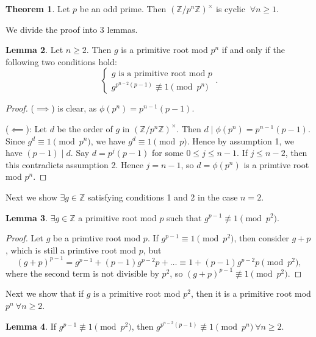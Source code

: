 \documentclass{article}
\theoremstyle{definition}
\newtheorem{theorem}{Theorem}[section]
\newtheorem{lemma}[theorem]{Lemma}
\begin{document}
\begin{theorem}%
    Let $p$ be an odd prime. Then $(\mathbb{Z}/p^n\mathbb{Z})^{\times}$ is cyclic $~\forall n\ge 1$.
\end{theorem}
We divide the proof into 3 lemmas.
\begin{lemma}%
    Let $n \ge 2$. Then $g$ is a primitive root mod $p^n$ if and only if the following two conditions hold: 
    \[
    \begin{cases}
        g \text{ is a primitive root mod }p \\
        g^{p^{n-2}(p-1)} \not\equiv 1 \pmod{p^n}
    \end{cases}.
    \]
\end{lemma}
\begin{proof}
    ($\implies $) is clear, as $\phi(p^n)=p^{n-1}(p-1)$.

    ($\impliedby$): Let $d$ be the order of $g$ in $(\mathbb{Z}/p^n\mathbb{Z})^{\times}$. Then $d \mid \phi(p^n) = p^{n-1}(p-1)$. Since $g^d \equiv 1 \pmod{p^n}$, we have $g^d \equiv 1 \pmod{p}$. Hence by assumption 1, we have $(p-1)\mid d$. Say $d = p^j (p-1)$ for some $0\le j \le n-1$. If $j\le n-2$, then this contradicts assumption 2. Hence $j=n-1$, so $d=\phi(p^n)$ is a primtive root mod $p^n$.
\end{proof}
Next we show $\exists g \in \mathbb{Z}$ satisfying conditions 1 and 2 in the case $n=2$.
\begin{lemma}
    $\exists g \in \mathbb{Z}$ a primitive root mod $p$ such that $g^{p-1} \not\equiv 1 \pmod{p^2}$.
\end{lemma}
\begin{proof}
    Let $g$ be a primtive root mod $p$. If $g^{p-1} \equiv 1\pmod{p^2}$, then consider $g+p$, which is still a primtive root mod $p$, but
    \[
    (g+p)^{p-1}=g^{p-1} + (p-1)g^{p-2}p + \ldots \equiv 1 + (p-1)g^{p-2}p \pmod{p^2},
    \]
    where the second term is not divisible by $p^2$, so $(g+p)^{p-1} \not\equiv 1 \pmod{p^2}$.
\end{proof}
Next we show that if $g$ is a primitive root mod $p^2$, then it is a primitive root mod $p^n ~\forall n\ge 2$.
\begin{lemma}
    If $g^{p-1} \not\equiv 1 \pmod{p^2}$, then $g^{p^{n-2}(p-1)} \not\equiv 1\pmod{p^n} ~\forall n\ge 2$. 
\end{lemma}
\end{document}
